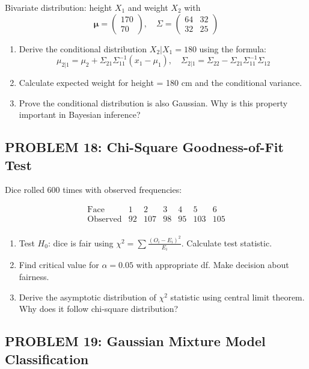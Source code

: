 \documentclass[12pt]{article}
\begin{document}
Bivariate distribution: height \(X_1\) and weight \(X_2\) with
\[
\boldsymbol{\mu} = \begin{pmatrix} 170 \\ 70 \end{pmatrix}, \quad
\Sigma = \begin{pmatrix} 64 & 32 \\ 32 & 25 \end{pmatrix}
\]

\begin{enumerate}
\item[(a)] Derive the conditional distribution \(X_2 | X_1 = 180\) using the formula:
\[
\mu_{2|1} = \mu_2 + \Sigma_{21}\Sigma_{11}^{-1}(x_1 - \mu_1), \quad \Sigma_{2|1} = \Sigma_{22} - \Sigma_{21}\Sigma_{11}^{-1}\Sigma_{12}
\]
\item[(b)] Calculate expected weight for height = 180 cm and the conditional variance.
\item[(c)] Prove the conditional distribution is also Gaussian. Why is this property important in Bayesian inference?
\end{enumerate}

\subsection*{PROBLEM 18: Chi-Square Goodness-of-Fit Test}

Dice rolled 600 times with observed frequencies:

\[\begin{array}{c|cccccc}
\text{Face} & 1 & 2 & 3 & 4 & 5 & 6 \\
\hline
\text{Observed} & 92 & 107 & 98 & 95 & 103 & 105 \\
\end{array}\]

\begin{enumerate}
\item[(a)] Test \(H_0\): dice is fair using \(\chi^2 = \sum \frac{(O_i - E_i)^2}{E_i}\). Calculate test statistic.
\item[(b)] Find critical value for \(\alpha = 0.05\) with appropriate df. Make decision about fairness.
\item[(c)] Derive the asymptotic distribution of \(\chi^2\) statistic using central limit theorem. Why does it follow chi-square distribution?
\end{enumerate}

\subsection*{PROBLEM 19: Gaussian Mixture Model Classification}
\end{document}
